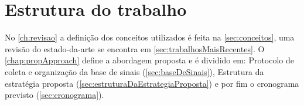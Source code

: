 	\section{Estrutura do trabalho}
			\par No \autoref{ch:revisao} a definição dos conceitos utilizados é feita na \autoref{sec:conceitos}, uma revisão do estado-da-arte se encontra em \autoref{sec:trabalhosMaisRecentes}. O \autoref{chap:propApproach} define a abordagem proposta e é dividido em: Protocolo de coleta e organização da base de sinais (\autoref{sec:baseDeSinais}), Estrutura da estratégia proposta (\autoref{sec:estruturaDaEstrategiaProposta}) e por fim o cronograma previsto (\autoref{sec:cronograma}).